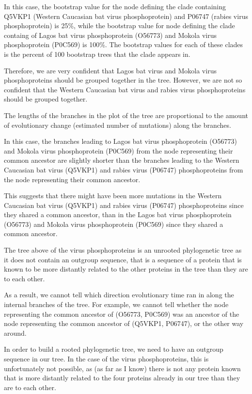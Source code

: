 \documentclass[
]{book}
\begin{document}
In this case, the bootstrap value for the node defining the clade containing Q5VKP1 (Western Caucasian bat virus phosphoprotein) and P06747 (rabies virus phosphoprotein) is 25\%, while the bootstrap value for node defining the clade containg of Lagos bat virus phosphoprotein (O56773) and Mokola virus phosphoprotein (P0C569) is 100\%. The bootstrap values for each of these clades is the percent of 100 bootstrap trees that the clade appears in.

Therefore, we are very confident that Lagos bat virus and Mokola virus phosphoproteins should be grouped together in the tree. However, we are not so confident that the Western Caucasian bat virus and rabies virus phosphoproteins should be grouped together.

The lengths of the branches in the plot of the tree are proportional to the amount of evolutionary change (estimated number of mutations) along the branches.

In this case, the branches leading to Lagos bat virus phosphoprotein (O56773) and Mokola virus phosphoprotein (P0C569) from the node representing their common ancestor are slightly shorter than the branches leading to the Western Caucasian bat virus (Q5VKP1) and rabies virus (P06747) phosphoproteins from the node representing their common ancestor.

This suggests that there might have been more mutations in the Western Caucasian bat virus (Q5VKP1) and rabies virus (P06747) phosphoproteins since they shared a common ancestor, than in the Lagos bat virus phosphoprotein (O56773) and Mokola virus phosphoprotein (P0C569) since they shared a common ancestor.

The tree above of the virus phosphoproteins is an unrooted phylogenetic tree as it does not contain an outgroup sequence, that is a sequence of a protein that is known to be more distantly related to the other proteins in the tree than they are to each other.

As a result, we cannot tell which direction evolutionary time ran in along the internal branches of the tree. For example, we cannot tell whether the node representing the common ancestor of (O56773, P0C569) was an ancestor of the node representing the common ancestor of (Q5VKP1, P06747), or the other way around.

In order to build a rooted phylogenetic tree, we need to have an outgroup sequence in our tree. In the case of the virus phosphoproteins, this is unfortunately not possible, as (as far as I know) there is not any protein known that is more distantly related to the four proteins already in our tree than they are to each other.
\end{document}
